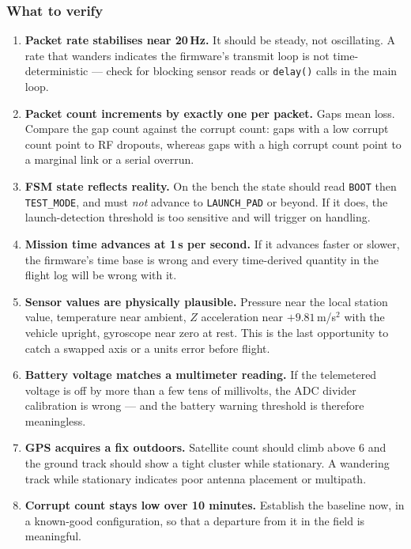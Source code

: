 \documentclass[11pt,a4paper]{article}
\newcommand{\code}[1]{\texttt{#1}}
\begin{document}
\subsubsection{What to verify}

\begin{enumerate}
  \item \textbf{Packet rate stabilises near 20\,Hz.} It should be steady, not
        oscillating. A rate that wanders indicates the firmware's transmit
        loop is not time-deterministic --- check for blocking sensor reads or
        \code{delay()} calls in the main loop.
  \item \textbf{Packet count increments by exactly one per packet.} Gaps mean
        loss. Compare the gap count against the corrupt count: gaps with a
        low corrupt count point to RF dropouts, whereas gaps with a high
        corrupt count point to a marginal link or a serial overrun.
  \item \textbf{FSM state reflects reality.} On the bench the state should
        read \code{BOOT} then \code{TEST\_MODE}, and must \emph{not} advance
        to \code{LAUNCH\_PAD} or beyond. If it does, the launch-detection
        threshold is too sensitive and will trigger on handling.
  \item \textbf{Mission time advances at 1\,s per second.} If it advances
        faster or slower, the firmware's time base is wrong and every
        time-derived quantity in the flight log will be wrong with it.
  \item \textbf{Sensor values are physically plausible.} Pressure near the
        local station value, temperature near ambient, $Z$ acceleration near
        $+9.81$\,m/s$^2$ with the vehicle upright, gyroscope near zero at
        rest. This is the last opportunity to catch a swapped axis or a
        units error before flight.
  \item \textbf{Battery voltage matches a multimeter reading.} If the
        telemetered voltage is off by more than a few tens of millivolts,
        the ADC divider calibration is wrong --- and the battery warning
        threshold is therefore meaningless.
  \item \textbf{GPS acquires a fix outdoors.} Satellite count should climb
        above 6 and the ground track should show a tight cluster while
        stationary. A wandering track while stationary indicates poor
        antenna placement or multipath.
  \item \textbf{Corrupt count stays low over 10 minutes.} Establish the
        baseline now, in a known-good configuration, so that a departure from
        it in the field is meaningful.
\end{enumerate}
\end{document}
